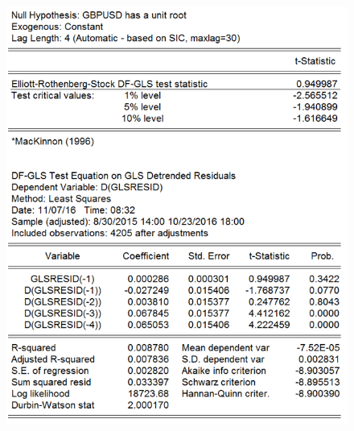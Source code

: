 \documentclass[11pt]{report}
\begin{document}
\begin{figure}[!h]
\begin{minipage}[c]{.46\linewidth}
\includegraphics[scale=0.5]{Appendix/chap2/2}
\end{minipage} \hfill
\end{figure}
\end{document}
